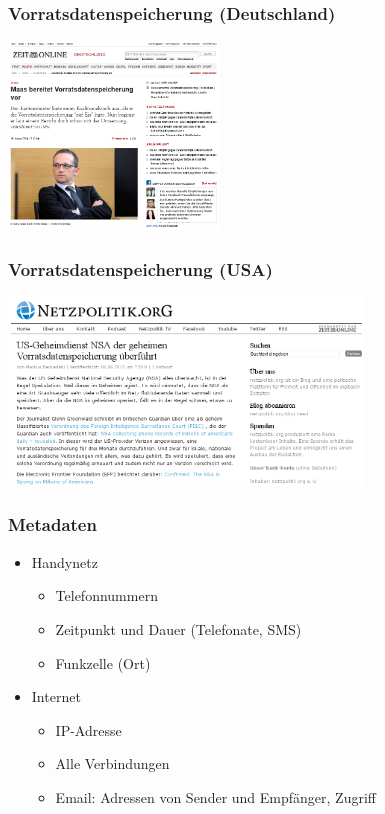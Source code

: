 \documentclass[12pt]{beamer}
\begin{document}
\begin{frame}
  \frametitle{Vorratsdatenspeicherung (Deutschland)}
    \begin{center}
      \includegraphics[height=5cm]{img/zeit-vds.png}
    \end{center}
\end{frame}

\begin{frame}
  \frametitle{Vorratsdatenspeicherung (USA)}
    \begin{center}
      \includegraphics[height=5cm]{img/netzpolitik-verizon.png}
    \end{center}
\end{frame}

\begin{frame}
  \frametitle{Metadaten}
  \begin{itemize}
    \item<2-> Handynetz
      \begin{itemize}
        \item<3-> Telefonnummern
        \item<4-> Zeitpunkt und Dauer (Telefonate, SMS)
        \item<5-> Funkzelle (Ort)
      \end{itemize}
    \item<6->Internet
      \begin{itemize}
        \item<3-> IP-Adresse
        \item<4-> Alle Verbindungen
        \item<5-> Email: Adressen von Sender und Empfänger, Zugriff
      \end{itemize}
  \end{itemize}
\end{frame}
\end{document}
